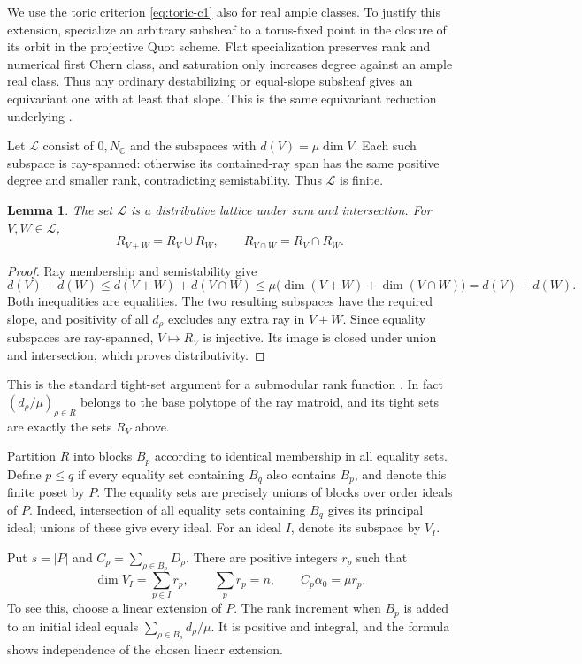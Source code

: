 \documentclass[11pt]{amsart}
\newtheorem{lemma}[theorem]{Lemma}
\theoremstyle{definition}
\theoremstyle{remark}
\newcommand{\CC}{\mathbb C}
\begin{document}
We use the toric criterion \eqref{eq:toric-c1} also for real ample
classes. To justify this extension, specialize an arbitrary subsheaf
to a torus-fixed point in the closure of its orbit in the projective
Quot scheme. Flat specialization preserves rank and numerical first
Chern class, and saturation only increases degree against an ample
real class. Thus any ordinary destabilizing or equal-slope subsheaf
gives an equivariant one with at least that slope. This is the same
equivariant reduction underlying \cite[Proposition~2.3]{HNS}.

Let $\mathcal L$ consist of $0,N_\CC$ and the subspaces with
$d(V)=\mu\dim V$. Each such subspace is ray-spanned: otherwise its
contained-ray span has the same positive degree and smaller rank,
contradicting semistability. Thus $\mathcal L$ is finite.

\begin{lemma}\label{lem:lattice}
The set $\mathcal L$ is a distributive lattice under sum and
intersection. For $V,W\in\mathcal L$,
\[
 R_{V+W}=R_V\cup R_W,\qquad R_{V\cap W}=R_V\cap R_W.
\]
\end{lemma}
\begin{proof}
Ray membership and semistability give
\[
 d(V)+d(W)\le d(V+W)+d(V\cap W)
 \le\mu\bigl(\dim(V+W)+\dim(V\cap W)\bigr)
 =d(V)+d(W).
\]
Both inequalities are equalities. The two resulting subspaces have
the required slope, and positivity of all $d_\rho$ excludes any extra
ray in $V+W$. Since equality subspaces are ray-spanned, $V\mapsto R_V$
is injective. Its image is closed under union and intersection, which
proves distributivity.
\end{proof}

This is the standard tight-set argument for a submodular rank function
\cite{Fujishige}. In fact $(d_\rho/\mu)_{\rho\in R}$ belongs to the
base polytope of the ray matroid, and its tight sets are exactly the
sets $R_V$ above.

Partition $R$ into blocks $B_p$ according to identical membership in
all equality sets. Define $p\le q$ if every equality set containing
$B_q$ also contains $B_p$, and denote this finite poset by $P$.
The equality sets are precisely unions of blocks over order ideals of
$P$. Indeed, intersection of all equality sets containing $B_q$ gives
its principal ideal; unions of these give every ideal.
For an ideal $I$, denote its subspace by $V_I$.

Put $s=|P|$ and $C_p=\sum_{\rho\in B_p}D_\rho$. There are positive
integers $r_p$ such that
\begin{equation}\label{eq:rank-valuation}
 \dim V_I=\sum_{p\in I}r_p,\qquad
 \sum_pr_p=n,\qquad C_p\alpha_0=\mu r_p.
\end{equation}
To see this, choose a linear extension of $P$. The rank increment
when $B_p$ is added to an initial ideal equals
$\sum_{\rho\in B_p}d_\rho/\mu$. It is positive and integral, and the
formula shows independence of the chosen linear extension.
\end{document}
